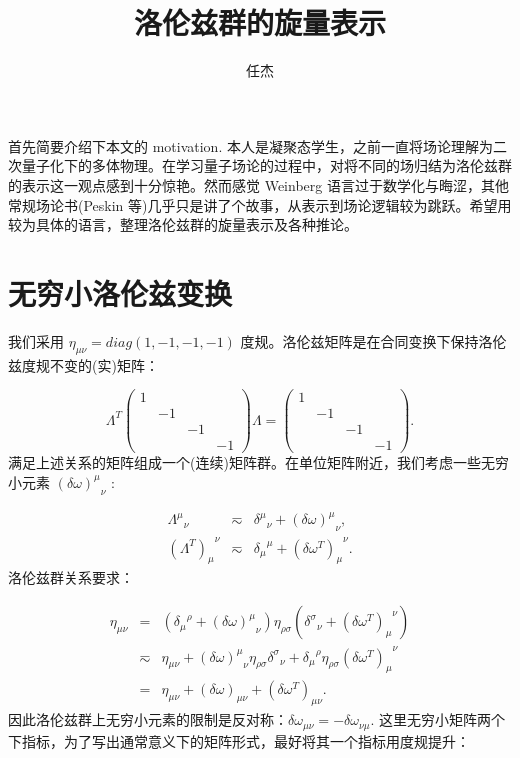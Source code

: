 \documentclass[10pt,UTF8]{ctexart}
\begin{document}
\title{洛伦兹群的旋量表示}
\author{任杰}
\date{}

\maketitle
\noindent
首先简要介绍下本文的 motivation. 本人是凝聚态学生，之前一直将场论理解为二次量子化下的多体物理。在学习量子场论的过程中，对将不同的场归结为洛伦兹群的表示这一观点感到十分惊艳。然而感觉
Weinberg 语言过于数学化与晦涩，其他常规场论书(Peskin 等)几乎只是讲了个故事，从表示到场论逻辑较为跳跃。希望用较为具体的语言，整理洛伦兹群的旋量表示及各种推论。

\section*{无穷小洛伦兹变换}
\noindent
我们采用 $\eta_{\mu\nu}=diag\left(1,-1,-1,-1\right)$ 度规。洛伦兹矩阵是在合同变换下保持洛伦兹度规不变的(实)矩阵：

\begin{equation}
\Lambda^{T}\left(\begin{array}{cccc}
1\\
 & -1\\
 &  & -1\\
 &  &  & -1
\end{array}\right)\Lambda=\left(\begin{array}{cccc}
1\\
 & -1\\
 &  & -1\\
 &  &  & -1
\end{array}\right).
\end{equation}
满足上述关系的矩阵组成一个(连续)矩阵群。在单位矩阵附近，我们考虑一些无穷小元素 ${\left(\delta\omega\right)^{\mu}}_{\nu}$
:

\begin{eqnarray}
{\Lambda^{\mu}}_{\nu} & \eqsim & {\delta^{\mu}}_{\nu}+{\left(\delta\omega\right)^{\mu}}_{\nu},\\
{\left(\Lambda^{T}\right)_{\mu}}^{\nu} & \eqsim & {\delta_{\mu}}^{\mu}+{\left(\delta\omega^{T}\right)_{\mu}}^{\nu}.
\end{eqnarray}
洛伦兹群关系要求：

\begin{eqnarray}
\eta_{\mu\nu} & = & \left({\delta_{\mu}}^{\rho}+{\left(\delta\omega\right)^{\mu}}_{\nu}\right)\eta_{\rho\sigma}\left({\delta^{\sigma}}_{\nu}+{\left(\delta\omega^{T}\right)_{\mu}}^{\nu}\right)\nonumber \\
 & \eqsim & \eta_{\mu\nu}+{\left(\delta\omega\right)^{\mu}}_{\nu}\eta_{\rho\sigma}{\delta^{\sigma}}_{\nu}+{\delta_{\mu}}^{\rho}\eta_{\rho\sigma}{\left(\delta\omega^{T}\right)_{\mu}}^{\nu}\nonumber \\
 & = & \eta_{\mu\nu}+\left(\delta\omega\right)_{\mu\nu}+\left(\delta\omega^{T}\right)_{\mu\nu}.
\end{eqnarray}
因此洛伦兹群上无穷小元素的限制是反对称：$\delta\omega_{\mu\nu}=-\delta\omega_{\nu\mu}$.
这里无穷小矩阵两个下指标，为了写出通常意义下的矩阵形式，最好将其一个指标用度规提升：
\end{document}

